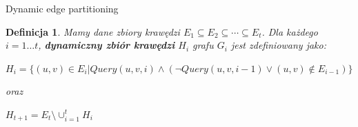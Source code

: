 \documentclass{beamer}
\newtheorem{df}{Definicja}
\begin{document}
\begin{frame}{Dynamic edge partitioning}
\begin{df}
Mamy dane zbiory krawędzi $E_1 \subseteq E_2 \subseteq \cdots \subseteq E_t$. Dla każdego $i=1\dots t$, \textbf{dynamiczny zbiór krawędzi} $H_i$ grafu $G_i$ jest zdefiniowany jako:

\vspace{0.4cm}
{\small $H_i = \{(u,v)\in E_i | Query(u,v,i) \wedge (\neg Query(u,v,i-1) \vee (u,v) \notin E_{i-1})\}$}

\vspace{0.4cm}
oraz

\vspace{0.4cm}
{\small $H_{t+1} = E_t \setminus \cup^t_{i=1}H_i$}

\end{df}
\end{frame}
\end{document}
